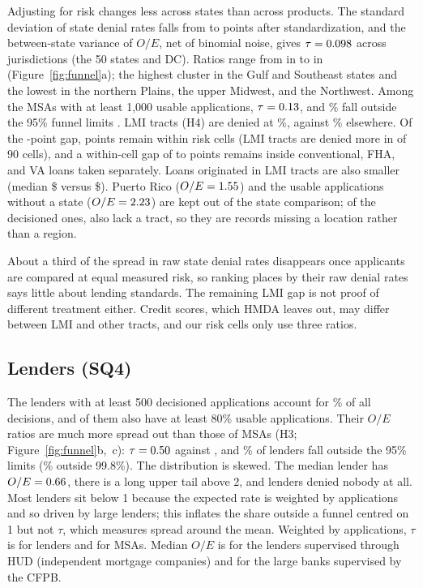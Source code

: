 \documentclass[acmtog,nonacm]{acmart}
\begin{document}
Adjusting for risk changes less across states than across products. The standard deviation of state denial rates falls from \sdStateRaw{} to \sdStateStd{} points after standardization, and the between-state variance of $O/E$, net of binomial noise, gives $\tau=0.098$ across \nStates{} jurisdictions (the 50 states and DC). Ratios range from \stMinOE{} in \stMinName{} to \stMaxOE{} in \stMaxName{} (Figure~\ref{fig:funnel}a); the highest cluster in the Gulf and Southeast states and the lowest in the northern Plains, the upper Midwest, and the Northwest. Among the \nMSA{} MSAs with at least 1,000 usable applications, $\tau=0.13$, and \msaOutside\% fall outside the 95\% funnel limits \citep[Figure~\ref{fig:funnel}c;][]{spiegelhalter2005}. LMI tracts (H4) are denied at \drLMI\%, against \drNonLMI\% elsewhere. Of the \kgLMIgap{}-point gap, \kgLMIrate{} points remain within risk cells (LMI tracts are denied more in \kgLMIhigher{} of 90 cells), and a within-cell gap of \lmiTypeMin{} to \lmiTypeMax{} points remains inside conventional, FHA, and VA loans taken separately. Loans originated in LMI tracts are also smaller (median \$\loanLMI{} versus \$\loanNonLMI). Puerto Rico ($O/E=1.55$) and the \nNoState{} usable applications without a state ($O/E=2.23$) are kept out of the state comparison; of the \nNoStateDec{} decisioned ones, \noStateNoTract{} also lack a tract, so they are records missing a location rather than a region.

About a third of the spread in raw state denial rates disappears once applicants are compared at equal measured risk, so ranking places by their raw denial rates says little about lending standards. The remaining LMI gap is not proof of different treatment either. Credit scores, which HMDA leaves out, may differ between LMI and other tracts, and our risk cells only use three ratios.

\subsection{Lenders (SQ4)}\label{sec:sqfour}

The \nLenderEightTwelve{} lenders with at least 500 decisioned applications account for \lenderShare\% of all decisions, and \nLender{} of them also have at least 80\% usable applications. Their $O/E$ ratios are much more spread out than those of MSAs (H3; Figure~\ref{fig:funnel}b,~c): $\tau=0.50$ against \tauMSA, and \lenderOutside\% of lenders fall outside the 95\% limits (\lenderOutsideHigh\% outside 99.8\%). The distribution is skewed. The median lender has $O/E=0.66$, there is a long upper tail above 2, and \nZeroDen{} lenders denied nobody at all. Most lenders sit below 1 because the expected rate is weighted by applications and so driven by large lenders; this inflates the share outside a funnel centred on 1 but not $\tau$, which measures spread around the mean. Weighted by applications, $\tau$ is \tauLenderW{} for lenders and \tauMSAW{} for MSAs. Median $O/E$ is \agHUD{} for the \nHUD{} lenders supervised through HUD (independent mortgage companies) and \agCFPB{} for the large banks supervised by the CFPB.
\end{document}

